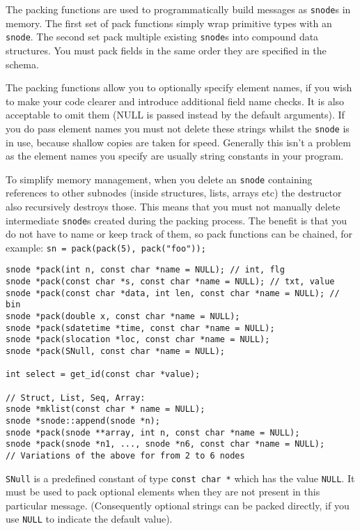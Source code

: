 \documentclass[12pt,a4paper,twoside]{article}
\renewcommand{\_}{\texttt{\symbol{95}}}
\begin{document}
The packing functions are used to programmatically build messages as
\verb^snode^s in memory. The first set of pack functions simply wrap primitive
types with an \verb^snode^. The second set pack multiple existing
\verb^snode^s into compound data structures. You must pack fields
in the same order they are specified in the schema.

The packing functions allow you to optionally specify element
names, if you wish to make your code clearer and introduce additional
field name checks. It is also acceptable to omit them (NULL is passed
instead by the default arguments). If you do pass element names
you must not delete these strings whilst the \verb^snode^ is in use,
because shallow copies are taken for speed. Generally this isn't
a problem as the element names you specify are usually string constants
in your program.

To simplify memory management, when you delete an \verb^snode^ containing
references to other subnodes (inside structures, lists, arrays etc)
the destructor also recursively destroys those. This means that you must
not manually delete intermediate \verb^snode^s created during the
packing process. The benefit is that you do not have to name or
keep track of them, so pack functions can be chained, for example:
\verb^sn = pack(pack(5), pack("foo"));^

\begin{verbatim}
snode *pack(int n, const char *name = NULL); // int, flg
snode *pack(const char *s, const char *name = NULL); // txt, value
snode *pack(const char *data, int len, const char *name = NULL); // bin
snode *pack(double x, const char *name = NULL);
snode *pack(sdatetime *time, const char *name = NULL);
snode *pack(slocation *loc, const char *name = NULL);
snode *pack(SNull, const char *name = NULL);

int select = get_id(const char *value);

// Struct, List, Seq, Array:
snode *mklist(const char * name = NULL);
snode *snode::append(snode *n);
snode *pack(snode **array, int n, const char *name = NULL);
snode *pack(snode *n1, ..., snode *n6, const char *name = NULL);
// Variations of the above for from 2 to 6 nodes
\end{verbatim}

\verb^SNull^ is a predefined constant of type \verb^const char *^ which
has the value \verb^NULL^. It must be used to pack
optional elements when they are not present in this particular message.
(Consequently optional strings can be packed directly, if you use
\verb^NULL^ to indicate the default value).
\end{document}
